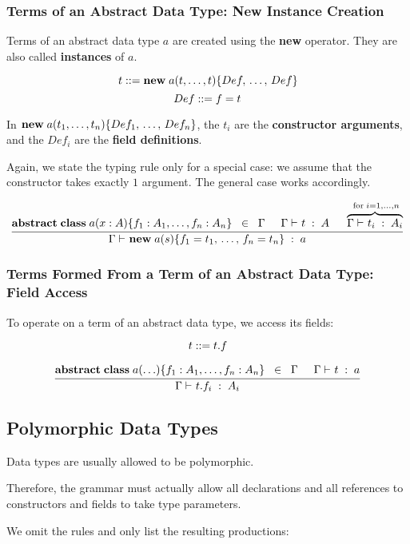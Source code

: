 \subsubsection{Terms of an Abstract Data Type: New Instance Creation}

Terms of an abstract data type $a$ are created using the \textbf{new} operator.
They are also called \textbf{instances} of $a$.

\[t \bbc \anewA{a}{t,\ldots,t}{Def,\ldots,Def}\]
\[Def ::= f=t\]

In $\anewA{a}{t_1,\ldots,t_n}{Def_1,\ldots,Def_n}$, the $t_i$ are the \textbf{constructor arguments}, and the $Def_i$ are the \textbf{field definitions}.

Again, we state the typing rule only for a special case: we assume that the constructor takes exactly $1$ argument.
The general case works accordingly.

\[\rul{\aclassAI{a}{x:A}{}{f_1:A_1,\ldots,f_n:A_n}\;\;\in\;\;\Gamma\tb
       \oftype{}{\Gamma}{t}{A} \tb
       \overbrace{\oftype{}{\Gamma}{t_i}{A_i}}^{\mfor i=1,\ldots,n}}
      {\oftype{}{\Gamma}{\anewA{a}{s}{f_1=t_1,\ldots,f_n=t_n}}{a}}\]


\subsubsection{Terms Formed From a Term of an Abstract Data Type: Field Access}

To operate on a term of an abstract data type, we access its fields:

\[t ::= t.f\]

\[\rul{\aclassAI{a}{\ldots}{}{f_1:A_1,\ldots,f_n:A_n}\;\;\in\;\;\Gamma\tb
       \oftype{}{\Gamma}{t}{a}}
      {\oftype{}{\Gamma}{t.f_i}{A_i}}\]

\subsection{Polymorphic Data Types}

Data types are usually allowed to be polymorphic.

Therefore, the grammar must actually allow all declarations and all references to constructors and fields to take type parameters.

We omit the rules and only list the resulting productions:

